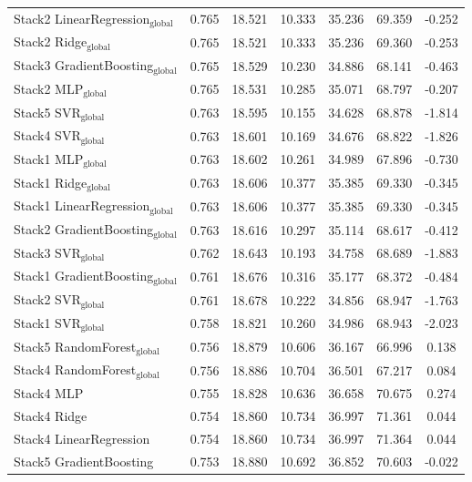 \documentclass[a4paper,twocolumn]{article}
\begin{document}
\begin{table}
{\begin{tabular}{p{4.5cm}cccccc}
        Stack2 LinearRegression$_{\text{global}}$ & 0.765 & 18.521 & 10.333 & 35.236 & 69.359 & -0.252 \\
        Stack2 Ridge$_{\text{global}}$ & 0.765 & 18.521 & 10.333 & 35.236 & 69.360 & -0.253 \\
        Stack3 GradientBoosting$_{\text{global}}$ & 0.765 & 18.529 & 10.230 & 34.886 & 68.141 & -0.463 \\
        Stack2 MLP$_{\text{global}}$ & 0.765 & 18.531 & 10.285 & 35.071 & 68.797 & -0.207 \\
        Stack5 SVR$_{\text{global}}$ & 0.763 & 18.595 & 10.155 & 34.628 & 68.878 & -1.814 \\
        Stack4 SVR$_{\text{global}}$ & 0.763 & 18.601 & 10.169 & 34.676 & 68.822 & -1.826 \\
        Stack1 MLP$_{\text{global}}$ & 0.763 & 18.602 & 10.261 & 34.989 & 67.896 & -0.730 \\
        Stack1 Ridge$_{\text{global}}$ & 0.763 & 18.606 & 10.377 & 35.385 & 69.330 & -0.345 \\
        Stack1 LinearRegression$_{\text{global}}$ & 0.763 & 18.606 & 10.377 & 35.385 & 69.330 & -0.345 \\
        Stack2 GradientBoosting$_{\text{global}}$ & 0.763 & 18.616 & 10.297 & 35.114 & 68.617 & -0.412 \\
        Stack3 SVR$_{\text{global}}$ & 0.762 & 18.643 & 10.193 & 34.758 & 68.689 & -1.883 \\
        Stack1 GradientBoosting$_{\text{global}}$ & 0.761 & 18.676 & 10.316 & 35.177 & 68.372 & -0.484 \\
        Stack2 SVR$_{\text{global}}$ & 0.761 & 18.678 & 10.222 & 34.856 & 68.947 & -1.763 \\
        Stack1 SVR$_{\text{global}}$ & 0.758 & 18.821 & 10.260 & 34.986 & 68.943 & -2.023 \\
        Stack5 RandomForest$_{\text{global}}$ & 0.756 & 18.879 & 10.606 & 36.167 & 66.996 & 0.138 \\
        Stack4 RandomForest$_{\text{global}}$ & 0.756 & 18.886 & 10.704 & 36.501 & 67.217 & 0.084 \\
        Stack4 MLP & 0.755 & 18.828 & 10.636 & 36.658 & 70.675 & 0.274 \\
        Stack4 Ridge & 0.754 & 18.860 & 10.734 & 36.997 & 71.361 & 0.044 \\
        Stack4 LinearRegression & 0.754 & 18.860 & 10.734 & 36.997 & 71.364 & 0.044 \\
        Stack5 GradientBoosting & 0.753 & 18.880 & 10.692 & 36.852 & 70.603 & -0.022 \\

\end{tabular}}
\end{table}
\end{document}
